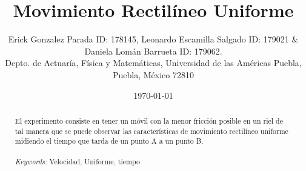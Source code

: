 \documentclass{article}
\begin{document}

\renewcommand{\footrulewidth}{1pt}
\renewcommand{\tablename}{Tabla}
\renewcommand{\figurename}{Figura}


\title{Movimiento Rectilíneo Uniforme}
\author{\small{Erick Gonzalez Parada ID: 178145, Leonardo Escamilla Salgado ID: 179021 $\&$ Daniela Lomán Barrueta ID: 179062.}\\		%
	   \small{Depto. de Actuaría, Física y Matemáticas, Universidad de las Américas Puebla, Puebla, M\'exico 72810}}
\date{\small{\today}}

\maketitle


\begin{abstract}

El experimento consiste en tener un móvil con la menor fricción posible en un riel de tal manera que se puede observar las características de movimiento rectilíneo uniforme midiendo el tiempo que tarda de un punto A a un punto B.
\\
\\
{\it Keywords:}  Velocidad, Uniforme, tiempo
\\
\\
\end{abstract}
\end{document}

